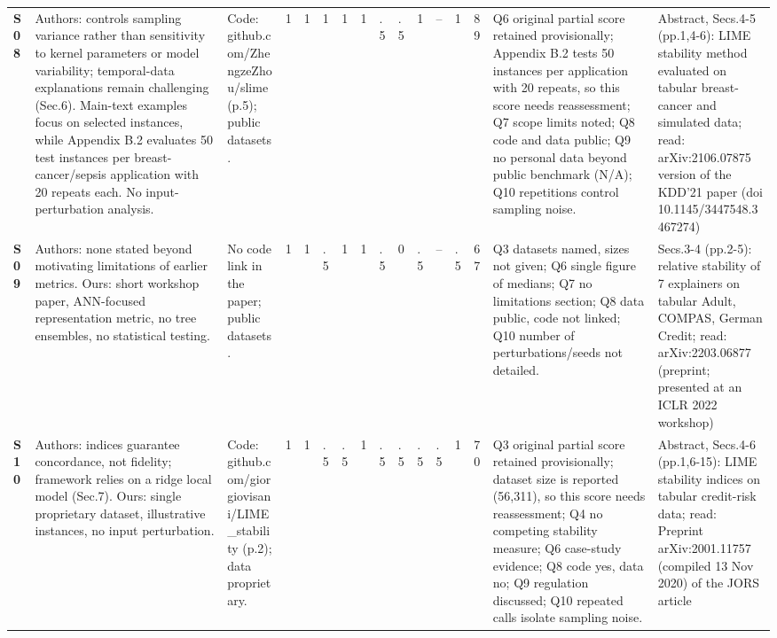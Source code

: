 \begin{longtable}{@{}P{1.0cm}P{4.6cm}P{3.6cm}P{0.3cm}P{0.3cm}P{0.3cm}P{0.3cm}P{0.3cm}P{0.3cm}P{0.3cm}P{0.3cm}P{0.3cm}P{0.36cm}P{0.75cm}P{3.0cm}P{3.9cm}@{}}
\textbf{S08} & Authors: controls sampling variance rather than sensitivity to kernel parameters or model variability; temporal-data explanations remain challenging (Sec.6). Main-text examples focus on selected instances, while Appendix B.2 evaluates 50 test instances per breast-cancer/\allowbreak{}sepsis application with 20 repeats each. No input-perturbation analysis. & Code: github.com/\allowbreak{}ZhengzeZhou/\allowbreak{}slime (p.5); public datasets. & 1 & 1 & 1 & 1 & 1 & .5 & .5 & 1 & -- & 1 & 89 & Q6 original partial score retained provisionally; Appendix B.2 tests 50 instances per application with 20 repeats, so this score needs reassessment; Q7 scope limits noted; Q8 code and data public; Q9 no personal data beyond public benchmark (N/\allowbreak{}A); Q10 repetitions control sampling noise. & Abstract, Secs.4-5 (pp.1,4-6): LIME stability method evaluated on tabular breast-cancer and simulated data; read: arXiv:2106.07875 version of the KDD'21 paper (doi 10.1145/\allowbreak{}3447548.3467274) \\
\textbf{S09} & Authors: none stated beyond motivating limitations of earlier metrics. Ours: short workshop paper, ANN-focused representation metric, no tree ensembles, no statistical testing. & No code link in the paper; public datasets. & 1 & 1 & .5 & 1 & 1 & .5 & 0 & .5 & -- & .5 & 67 & Q3 datasets named, sizes not given; Q6 single figure of medians; Q7 no limitations section; Q8 data public, code not linked; Q10 number of perturbations/\allowbreak{}seeds not detailed. & Secs.3-4 (pp.2-5): relative stability of 7 explainers on tabular Adult, COMPAS, German Credit; read: arXiv:2203.06877 (preprint; presented at an ICLR 2022 workshop) \\
\textbf{S10} & Authors: indices guarantee concordance, not fidelity; framework relies on a ridge local model (Sec.7). Ours: single proprietary dataset, illustrative instances, no input perturbation. & Code: github.com/\allowbreak{}giorgiovisani/\allowbreak{}LIME\_\allowbreak{}stability (p.2); data proprietary. & 1 & 1 & .5 & .5 & 1 & .5 & .5 & .5 & .5 & 1 & 70 & Q3 original partial score retained provisionally; dataset size is reported (56,311), so this score needs reassessment; Q4 no competing stability measure; Q6 case-study evidence; Q8 code yes, data no; Q9 regulation discussed; Q10 repeated calls isolate sampling noise. & Abstract, Secs.4-6 (pp.1,6-15): LIME stability indices on tabular credit-risk data; read: Preprint arXiv:2001.11757 (compiled 13 Nov 2020) of the JORS article \\

\end{longtable}
